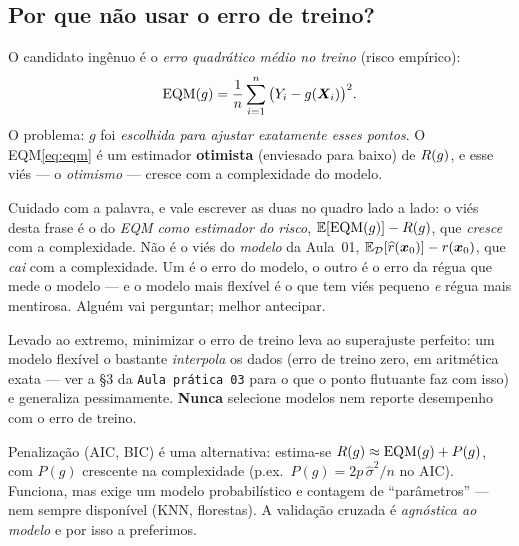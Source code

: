 \documentclass[11pt,a4paper]{article}
\begin{document}
\subsection{Por que não usar o erro de treino?}
O candidato ingênuo é o \emph{erro quadrático médio no treino} (risco empírico):
\begin{equation}\label{eq:eqm}
  \mathrm{EQM}(g) = \frac1n \sum_{i=1}^n \big(Y_i - g(\bm{X}_i)\big)^2 .
\end{equation}
O problema: $g$ foi \emph{escolhida para ajustar exatamente esses pontos}. O
EQM\eqref{eq:eqm} é um estimador \textbf{otimista} (enviesado para baixo) de
$R(g)$, e esse viés --- o \emph{otimismo} --- cresce com a complexidade do
modelo.

\begin{emsala}
Cuidado com a palavra, e vale escrever as duas no quadro lado a lado: o viés desta
frase é o do \emph{EQM como estimador do risco},
$\mathbb{E}[\mathrm{EQM}(g)]-R(g)$, que \emph{cresce} com a complexidade. Não é o viés
do \emph{modelo} da Aula~01, $\mathbb{E}_{\mathcal{D}}[\widehat{r}(\bm{x}_0)]-r(\bm{x}_0)$, que \emph{cai} com a
complexidade. Um é o erro do modelo, o outro é o erro da régua que mede o modelo ---
e o modelo mais flexível é o que tem viés pequeno \emph{e} régua mais mentirosa.
Alguém vai perguntar; melhor antecipar.
\end{emsala}

\begin{atencao}
Levado ao extremo, minimizar o erro de treino leva ao superajuste perfeito: um
modelo flexível o bastante \emph{interpola} os dados (erro de treino zero, em
aritmética exata --- ver a §3 da \texttt{Aula prática 03} para o que o ponto
flutuante faz com isso) e generaliza pessimamente. \textbf{Nunca} selecione
modelos nem reporte desempenho com o erro de treino.
\end{atencao}

\begin{observacao}
Penalização (AIC, BIC) é uma alternativa: estima-se
$R(g)\approx \mathrm{EQM}(g)+P(g)$, com $P(g)$ crescente na complexidade
(p.ex.\ $P(g)=2p\,\widehat\sigma^2/n$ no AIC). Funciona, mas exige um modelo
probabilístico e contagem de ``parâmetros'' --- nem sempre disponível (KNN,
florestas). A validação cruzada é \emph{agnóstica ao modelo} e por isso a
preferimos.
\end{observacao}

\end{document}
